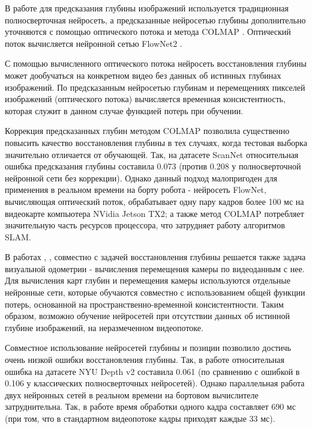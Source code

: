 \documentclass{mipt-thesis-ms}
\begin{document}
	В работе \cite{luo2020consistent} для предсказания глубины изображений используется традиционная полносверточная нейросеть, а предсказанные нейросетью глубины дополнительно уточняются с помощью оптического потока и метода COLMAP \cite{schonberger2016structure}. Оптический поток вычисляется нейронной сетью FlowNet2 \cite{ilg2017flownet}.
	
	С помощью вычисленного оптического потока нейросеть восстановления глубины может дообучаться на конкретном видео без данных об истинных глубинах изображений. По предсказанным нейросетью глубинам и перемещениях пикселей изображений (оптического потока) вычисляется временная консистентность, которая служит в данном случае функцией потерь при обучении.
	
	Коррекция предсказанных глубин методом COLMAP позволила существенно повысить качество восстановления глубины в тех случаях, когда тестовая выборка значительно отличается от обучающей. Так, на датасете ScanNet \cite{dai2017scannet} относительная ошибка предсказания глубины составила 0.073 (против 0.208 у полносверточной нейронной сети без коррекции). Однако данный подход малопригоден для применения в реальном времени на борту робота - нейросеть FlowNet, вычисляющая оптический поток, обрабатывает одну пару кадров более 100 мс на видеокарте компьютера NVidia Jetson TX2; а также метод COLMAP потребляет значительную часть ресурсов процессора, что затрудняет работу алгоритмов SLAM.
	
	В работах \cite{zhou2017unsupervised}, \cite{yang2020d3vo}, \cite{teed2018deepv2d} совместно с задачей восстановления глубины решается также задача визуальной одометрии - вычисления перемещения камеры по видеоданным с нее. Для вычисления карт глубин и перемещения камеры используются отдельные нейронные сети, которые обучаются совместно с использованием общей функции потерь, основанной на пространственно-временной консистентности. Таким образом, возможно обучение нейросетей при отсутствии данных об истинной глубине изображений, на неразмеченном видеопотоке.
	
	Совместное использование нейросетей глубины и позиции позволило достичь очень низкой ошибки восстановления глубины. Так, в работе \cite{teed2018deepv2d} относительная ошибка на датасете NYU Depth v2 \cite{silberman2012indoor} составила 0.061 (по сравнению с ошибкой в 0.106 у классических полносверточных нейросетей). Однако параллельная работа двух нейронных сетей в реальном времени на бортовом вычислителе затруднительна. Так, в работе \cite{teed2018deepv2d} время обработки одного кадра составляет 690 мс (при том, что в стандартном видеопотоке кадры приходят каждые 33 мс).
	
\end{document}
